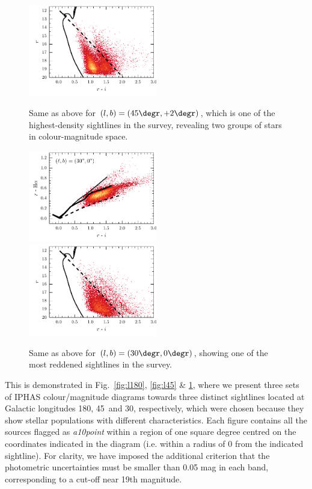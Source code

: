 \documentclass[a4paper,useAMS,usenatbib]{mn2e}
\begin{document}
\begin{figure}
\begin{minipage}[b]{\linewidth}
        \includegraphics[width=0.5\textwidth]{figures/diagrams/cmd-45-2.pdf}
    \end{minipage}
    \caption{Same as above for $(l,b)=(45\degr,+2\degr)$,
    which is one of the highest-density sightlines in the survey,
    revealing two groups of stars in colour-magnitude space.}
    \label{fig:l45}
    \begin{minipage}[b]{\linewidth}
        \includegraphics[width=0.5\textwidth]{figures/diagrams/ccd-30-0.pdf}
        \includegraphics[width=0.5\textwidth]{figures/diagrams/cmd-30-0.pdf} 
    \end{minipage}
    \caption{Same as above for $(l,b)=(30\degr,0\degr)$,
    showing one of the most reddened sightlines in the survey.
    }
    \label{fig:l30}
\end{figure}

This is demonstrated 
in Fig.~\ref{fig:l180}, \ref{fig:l45} \& \ref{fig:l30},
where we present three sets of IPHAS colour/magnitude diagrams
towards three distinct sightlines
located at Galactic longitudes 
180\degr, 45\degr\ and 30\degr, respectively,
which were chosen because they show stellar populations
with different characteristics.
Each figure contains all the sources
flagged as \emph{a10point} within a region of one square degree 
centred on the coordinates indicated in the diagram
(i.e. within a radius of 0 from the indicated sightline).
For clarity, we have imposed the additional criterion
that the photometric uncertainties
must be smaller than 0.05 mag in each band,
corresponding to a cut-off near 19th magnitude.
\end{document}
